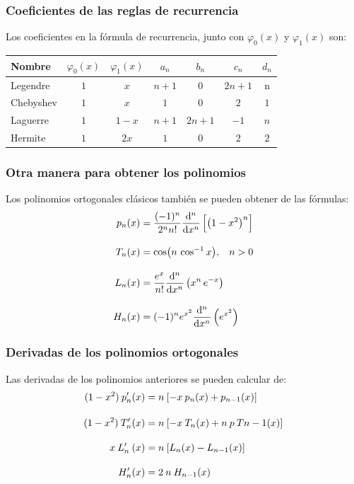 \documentclass[12pt]{beamer}
\begin{document}
\begin{frame}
\frametitle{Coeficientes de las reglas de recurrencia}
Los coeficientes en la fórmula de recurrencia, junto con $\varphi_{0} (x)$ y $\varphi_{1} (x)$ son:
\pause
\begin{table}
\centering
\fontsize{12}{12}\selectfont
\begin{tabular}{| l | c | c | c | c | c | c |}
\hline
Nombre & $\varphi_{0}(x)$ & $\varphi_{1}(x)$ & $a_{n}$ & $b_{n}$ & $c_{n}$ & $d_{n}$ \\ \hline
Legendre & $1$ & $x$ & $n+1$ & $0$ & $2n+1$ & n \\
Chebyshev & $1$ & $x$ & $1$ & $0$ & $2$ & $1$ \\
Laguerre & $1$ & $1-x$ & $n+1$ & $2n+1$ & $-1$ & $n$ \\
Hermite & $1$ & $2x$ & $1$ & $0$ & $2$ & $2$ \\ \hline
\end{tabular}
\end{table}
\end{frame}
\begin{frame}
\frametitle{Otra manera para obtener los polinomios}
Los polinomios ortogonales clásicos también se pueden obtener de las fórmulas:
\pause
\begin{align*}
p_{n} (x) &= \dfrac{(-1)^{n}}{2^{n}n!} \dv[n]{x} \left[ \left( 1 - x^{2} \right)^{n} \right] \\[1em]
T_{n} (x) &= \cos(n \, \cos^{-1} x), \hspace{0.3cm} n > 0 \\[1em]
L_{n} (x) &= \dfrac{e^{x}}{n!} \dv[n]{x} \left( x^{n} \, e^{-x} \right) \\[1em]
H_{n} (x) &= (-1)^{n} e^{x^{2}} \dv[n]{x} \left(e^{x^{2}} \right)
\end{align*}
\end{frame}
\begin{frame}
\frametitle{Derivadas de los polinomios ortogonales}
Las derivadas de los polinomios anteriores se pueden calcular de:
\pause
\begin{align*}
(1 - x^{2}) \: {p}^{\prime}_{n} (x) &= n \: [ -x \: p_{n} (x) + p_{n - 1} (x) ] \\[1em]
(1 - x^{2}) \: {T}^{\prime}_{n} (x) &= n \: [-x \: T_{n} (x) + n \: p \: T{n - 1} (x) ] \\[1em]
x \: {L}^{\prime}_{n} \: (x) &= n \: [ L_{n} (x) - L_{n - 1} (x) ] \\[1em]
{H}^{\prime}_{n} (x) &= 2 \: n \:  H_{n - 1} (x)
\end{align*}
\end{frame}
\end{document}
